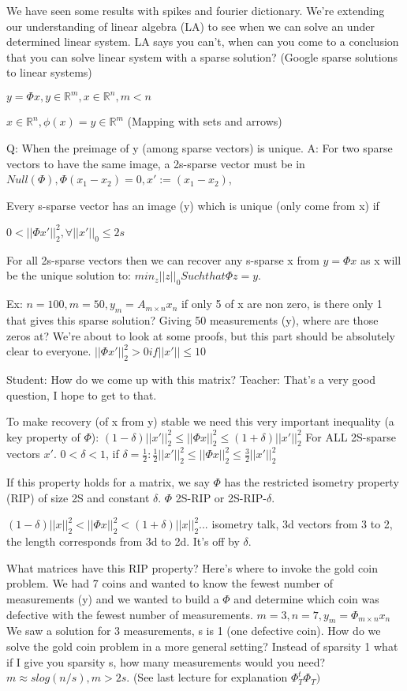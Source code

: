 \documentclass[12pt,letterpaper]{report}
\begin{document}
We have seen some results with spikes and fourier dictionary.  We're extending our understanding of linear algebra (LA) to see when we can solve an under determined linear system.  LA says you can't, when can you come to a conclusion that you can solve linear system with a sparse solution?  (Google sparse solutions to linear systems)

$y = \Phi x, y \in \mathbb{R}^m, x \in \mathbb{R}^n, m < n$

$x \in \mathbb{R}^n, \phi(x) = y \in \mathbb{R}^m$  (Mapping with sets and arrows)

Q: When the preimage of y (among sparse vectors) is unique.  A: For two sparse vectors to have the same image, a 2s-sparse vector must be in $Null(\Phi), \Phi(x_1 - x_2) = 0, x' := (x_1 - x_2)$, 

Every s-sparse vector has an image (y) which is unique (only come from x) if

$0 < ||\Phi x' ||_2^2, \forall ||x'||_0 \leq 2s$

For all 2s-sparse vectors then we can recover any s-sparse x from $y = \Phi x$ as x will be the unique solution to: $min_z||z||_0 Such that \Phi z = y$.

Ex: $n = 100, m = 50,  y_m = A_{m \times n} x_n$ if only 5 of x are non zero, is there only 1 that gives this sparse solution?  Giving 50 measurements (y), where are those zeros at?  We're about to look at some proofs, but this part should be absolutely clear to everyone.  $|| \Phi x' ||_2^2 > 0 if ||x'|| \leq 10$

Student: How do we come up with this matrix?  Teacher: That's a very good question, I hope to get to that.

To make recovery (of x from y) stable we need this very important inequality (a key property of $\Phi$): $(1 - \delta) ||x'||_2^2 \leq ||\Phi x||_2^2 \leq (1 + \delta) ||x'||_2^2$ For ALL 2S-sparse vectors $x'$.  $0 < \delta < 1$, if $\delta = \frac{1}{2}: \frac{1}{2}||x'||_2^2 \leq ||\Phi x||_2^2 \leq \frac{3}{2}||x'||_2^2$

If this property holds for a  matrix, we say $\Phi$ has the restricted isometry property (RIP) of size 2S and constant $\delta$. $\Phi$ 2S-RIP or 2S-RIP-$\delta$.

$(1-\delta)||x||_2^2 < ||\Phi x||_2^2 < (1+\delta)||x||_2^2$... isometry talk, 3d vectors from 3 to 2, the length corresponds from 3d to 2d.  It's off by $\delta$.

What matrices have this RIP property?  Here's where to invoke the gold coin problem.  We had 7 coins and wanted to know the fewest number of measurements (y) and we wanted to build a $\Phi$ and determine which coin was defective with the fewest number of measurements.  $m=3, n=7, y_m = \Phi_{m \times n} x_n$ We saw a solution for 3 measurements, s is 1 (one defective coin). How do we solve the gold coin problem in a more general setting?  Instead of sparsity 1 what if I give you sparsity s, how many measurements would you need? $m \approx s log(n/s), m > 2s$.  (See last lecture for explanation $\Phi_T^t \Phi_T)$
\end{document}
